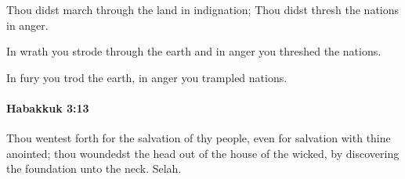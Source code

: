 			\begin{versebox}
					\item[BHS] 
					\item[LXX] 
					\item[ASV] Thou didst march through the land in indignation; Thou didst thresh the nations in anger.
					\item[NIV] In wrath you strode through the earth and in anger you threshed the nations.
					\item[NRSV] In fury you trod the earth, in anger you trampled nations.
			\end{versebox}

		\paragraph{Habakkuk 3:13} %
			\label{HABAKKUK-3-13}

			Thou wentest forth for the salvation of thy people, even for salvation with thine anointed; thou woundedst the head out of the house of the wicked, by discovering the foundation unto the neck. Selah.

